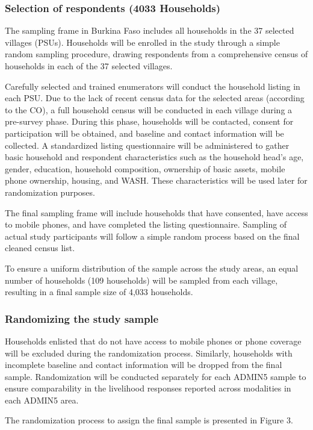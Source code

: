 \documentclass[11pt,harvard]{article}
\begin{document}
\subsubsection{Selection of respondents (4033 Households)}
The sampling frame in Burkina Faso includes all households in the 37 selected villages (PSUs). Households will be enrolled in the study through a simple random sampling procedure, drawing respondents from a comprehensive census of households in each of the 37 selected villages.

Carefully selected and trained enumerators will conduct the household listing in each PSU. Due to the lack of recent census data for the selected areas (according to the CO), a full household census will be conducted in each village during a pre-survey phase. During this phase, households will be contacted, consent for participation will be obtained, and baseline and contact information will be collected. A standardized listing questionnaire will be administered to gather basic household and respondent characteristics such as the household head's age, gender, education, household composition, ownership of basic assets, mobile phone ownership, housing, and WASH. These characteristics will be used later for randomization purposes.

The final sampling frame will include households that have consented, have access to mobile phones, and have completed the listing questionnaire. Sampling of actual study participants will follow a simple random process based on the final cleaned census list.

To ensure a uniform distribution of the sample across the study areas, an equal number of households (109 households) will be sampled from each village, resulting in a final sample size of 4,033 households.

\subsubsection{Randomizing the study sample}
Households enlisted that do not have access to mobile phones or phone coverage will be excluded during the randomization process. Similarly, households with incomplete baseline and contact information will be dropped from the final sample. Randomization will be conducted separately for each ADMIN5 sample to ensure comparability in the livelihood responses reported across modalities in each ADMIN5 area.

The randomization process to assign the final sample is presented in Figure 3.
\end{document}
